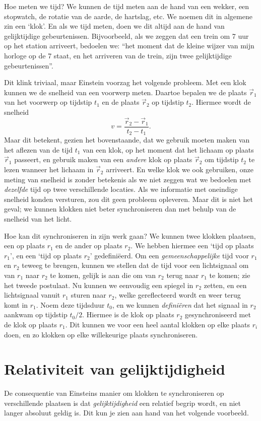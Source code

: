 Hoe meten we tijd? We kunnen de tijd meten aan de hand van een wekker,
een stopwatch, de rotatie van de aarde, de hartslag, etc. We noemen
dit in algemene zin een `klok'. En als we tijd meten, doen we dit altijd 
aan de hand van gelijktijdige gebeurtenissen. Bijvoorbeeld, als we zeggen
dat een trein om 7 uur op het station arriveert, bedoelen we: ``het
moment dat de kleine wijzer van mijn horloge op de 7 staat, 
en het arriveren van de trein, zijn twee gelijktijdige gebeurtenissen''. 

Dit klink triviaal, maar Einstein voorzag het volgende probleem.  Met
een klok kunnen we de snelheid van een voorwerp meten. Daartoe bepalen
we de plaats $\vec{r}_1$ van het voorwerp op tijdstip $t_1$ en de
plaats $\vec{r}_2$ op tijdstip $t_2$. Hiermee wordt de snelheid
\[
v = \frac{\vec{r}_2-\vec{r}_1}{t_2-t_1}.
\]
Maar dit betekent, gezien het bovenstaande, dat we gebruik moeten
maken van het aflezen van de tijd $t_1$ van een klok, op het moment
dat het lichaam op plaats $\vec{r}_1$ passeert, en gebruik maken van
een {\it andere} klok op plaats $\vec{r}_2$ om tijdstip $t_2$ te lezen
wanneer het lichaam in $\vec{r}_2$ arriveert. En welke klok we ook
gebruiken, onze meting van snelheid is zonder betekenis als we niet
zeggen wat we bedoelen met {\it dezelfde} tijd op twee verschillende
locaties. Als we informatie met oneindige snelheid konden versturen,
zou dit geen probleem opleveren. Maar dit is niet het geval; we kunnen
klokken niet beter synchroniseren dan met behulp van de snelheid van
het licht. 

Hoe kan dit synchroniseren in zijn werk gaan? We kunnen twee klokken
plaatsen, een op plaats $r_1$ en de ander op plaats $r_2$. We hebben
hiermee een `tijd op plaats $r_1$', en een `tijd op plaats $r_2$'
gedefini\"eerd. Om een {\it gemeenschappelijke} tijd voor $r_1$ en $r_2$
teweeg te brengen, kunnen we stellen dat de tijd voor een lichtsignaal
om van $r_1$ naar $r_2$ te komen, gelijk is aan die om van $r_2$ terug
naar $r_1$ te komen; zie het tweede postulaat. Nu kunnen we eenvoudig
een spiegel in $r_2$ zetten, en een lichtsignaal vanuit $r_1$ sturen
naar $r_2$, welke gereflecteerd wordt en weer terug komt in
$r_1$. Noem deze tijdsduur $t_0$, en we kunnen {\it defini\"eren} dat
het signaal in $r_2$ aankwam op tijdstip $t_0/2$.  Hiermee is de klok
op plaats $r_2$ gesynchroniseerd met de klok op plaats $r_1$. Dit
kunnen we voor een heel aantal klokken op elke plaats $r_i$ doen, en
zo klokken op elke willekeurige plaats synchroniseren.

\section{Relativiteit van gelijktijdigheid}
De consequentie van Einsteins manier om klokken  te synchroniseren op
verschillende plaatsen is dat {\it gelijktijdigheid} een relatief
begrip wordt, en niet langer absoluut geldig is. Dit kun je zien aan
hand van het volgende voorbeeld.

